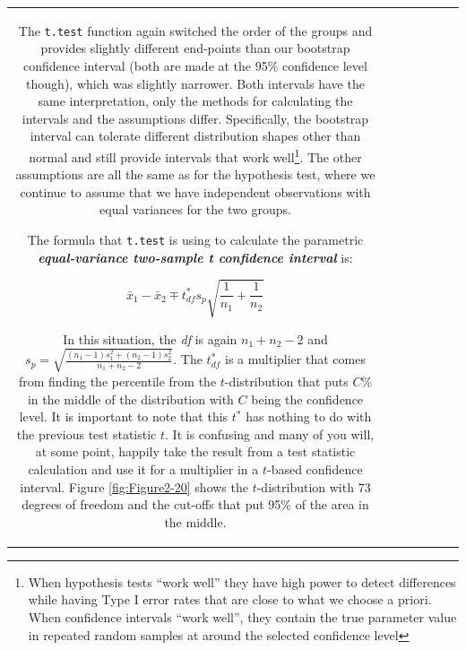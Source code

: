 \documentclass[]{book}
\newenvironment{Shaded}{\begin{snugshade}}{\end{snugshade}}
\let\rmarkdownfootnote\footnote%
\def\footnote{\protect\rmarkdownfootnote}
\theoremstyle{definition}
\theoremstyle{definition}
\theoremstyle{remark}
\begin{document}
\begin{longtable}[]{@{}ccccccc@{}}
\begin{minipage}[b]{0.10\columnwidth}
\begin{Shaded}
\begin{Highlighting}[]
\begin{Shaded}
\begin{Highlighting}[]
The \texttt{t.test} function again switched the order of the groups and
provides slightly different end-points than our bootstrap confidence
interval (both are made at the 95\% confidence level though), which was
slightly narrower. Both intervals have the same interpretation, only the
methods for calculating the intervals and the assumptions differ.
Specifically, the bootstrap interval can tolerate different distribution
shapes other than normal and still provide intervals that work
well\footnote{When hypothesis tests ``work well'' they have high power
  to detect differences while having Type I error rates that are close
  to what we choose a priori. When confidence intervals ``work well'',
  they contain the true parameter value in repeated random samples at
  around the selected confidence level}. The other assumptions are all
the same as for the hypothesis test, where we continue to assume that we
have independent observations with equal variances for the two groups.

The formula that \texttt{t.test} is using to calculate the parametric
\textbf{\emph{equal-variance two-sample t confidence interval}} is:

\[\bar{x}_1 - \bar{x}_2 \mp t^*_{df}s_p\sqrt{\frac{1}{n_1}+\frac{1}{n_2}}\]

In this situation, the \emph{df} is again \(n_1+n_2-2\) and
\(s_p = \sqrt{\frac{(n_1-1)s_1^2 + (n_2-1)s_2^2}{n_1+n_2-2}}\). The
\(t^*_{df}\) is a multiplier that comes from finding the percentile from
the \(t\)-distribution that puts \(C\)\% in the middle of the
distribution with \(C\) being the confidence level. It is important to
note that this \(t^*\) has nothing to do with the previous test
statistic \(t\). It is confusing and many of you will, at some point,
happily take the result from a test statistic calculation and use it for
a multiplier in a \(t\)-based confidence interval. Figure
\ref{fig:Figure2-20} shows the \(t\)-distribution with 73 degrees of
freedom and the cut-offs that put 95\% of the area in the middle.





\end{Highlighting}
\end{Shaded}
\end{Highlighting}
\end{Shaded}
\end{minipage}
\end{longtable}
\end{document}
